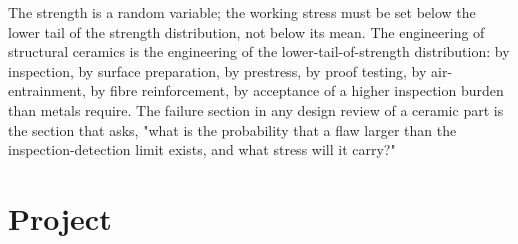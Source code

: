 \begin{principle}
The strength is a random variable; the working stress must be set
below the lower tail of the strength distribution, not below its mean.
The engineering of structural ceramics is the engineering of the
lower-tail-of-strength distribution: by inspection, by surface
preparation, by prestress, by proof testing, by air-entrainment, by
fibre reinforcement, by acceptance of a higher inspection burden than
metals require. The failure section in any design review of a ceramic
part is the section that asks, "what is the probability that a flaw
larger than the inspection-detection limit exists, and what stress
will it carry?"
\end{principle}

\section{Project}

